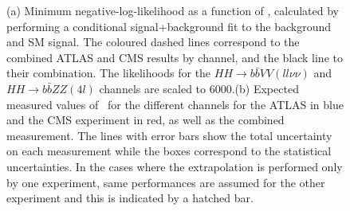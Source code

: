 




\begin{figure}[!htb]
\centering 
{} 
\caption{(a) Minimum negative-log-likelihood as a function of \kl, calculated by performing a conditional signal+background fit to the background and SM signal. The coloured dashed lines correspond to the combined ATLAS and CMS results by channel, and the black line to their combination. The likelihoods for the $HH \rightarrow b\bar{b}VV(ll\nu\nu)$ and $HH \rightarrow b\bar{b}ZZ(4l)$ channels are scaled to 6000\fbinv.(b) Expected measured values of \kl\ for the different channels for the ATLAS in blue and the CMS experiment in red, as well as the combined measurement. The lines with error bars show the total uncertainty on each measurement while the boxes correspond to the statistical uncertainties. In the cases where the extrapolation is performed only by one experiment, same performances are assumed for the other experiment and this is indicated by a hatched bar.} 
\label{fig:comb_HH} 
\end{figure}


